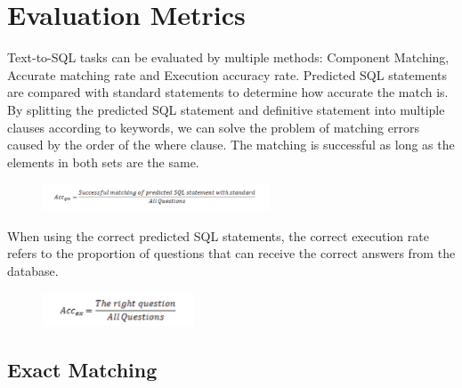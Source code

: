 \section{Evaluation Metrics} \label{eval}

Text-to-SQL tasks can be evaluated by multiple methods: Component Matching, Accurate matching rate and Execution accuracy rate. Predicted SQL statements are compared with standard statements to determine how accurate the match is.
By splitting the predicted SQL statement and definitive statement into multiple clauses according to keywords, we can solve the problem of matching errors caused by the order of the where clause. The matching is successful as long as the elements in both sets are the same.

\begin{figure}[htb]
    \centering
    \includegraphics[width=0.6\textwidth]{pics/acc1.png}
    \label{fig:acc1}
\end{figure}

When using the correct predicted SQL statements, the correct execution rate refers to the proportion of questions that can receive the correct answers from the database.

\begin{figure}[htb]
    \centering
    \includegraphics[width=0.4\textwidth]{pics/acc2.png}
    \label{fig:acc2}
\end{figure}



\subsection{Exact Matching}

